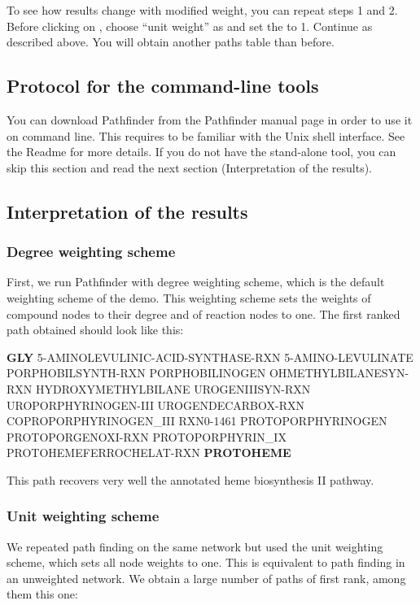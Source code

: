 To see how results change with modified weight, you can repeat steps 1 and 2. Before clicking on , choose ``unit weight'' as  and set the  to 1. Continue as described above. You will obtain another paths table than before.

\subsection{Protocol for the command-line tools}

You can download Pathfinder from the Pathfinder manual page in order to use it on command line.
This requires to be familiar with the Unix shell interface. See the Readme for more details.
If you do not have the stand-alone tool, you can skip this section
and read the next section (Interpretation of the results).

\subsection{Interpretation of the results}

\subsubsection{Degree weighting scheme}

First, we run Pathfinder with degree weighting scheme, which is the default weighting scheme of the demo. This weighting scheme sets the weights of compound nodes to their degree and of reaction nodes to one. The first ranked path obtained should look like this:

\textbf{GLY} 5-AMINOLEVULINIC-ACID-SYNTHASE-RXN  5-AMINO-LEVULINATE  PORPHOBILSYNTH-RXN PORPHOBILINOGEN OHMETHYLBILANESYN-RXN HYDROXYMETHYLBILANE UROGENIIISYN-RXN UROPORPHYRINOGEN-III UROGENDECARBOX-RXN COPROPORPHYRINOGEN\_III RXN0-1461 PROTOPORPHYRINOGEN PROTOPORGENOXI-RXN PROTOPORPHYRIN\_IX PROTOHEMEFERROCHELAT-RXN \textbf{PROTOHEME}

This path recovers very well the annotated heme biosynthesis II pathway.

\subsubsection{Unit weighting scheme}
We repeated path finding on the same network but used the unit weighting scheme, which sets all node weights to one. This is equivalent to path finding in an unweighted network. We obtain a large number of paths of first rank, among them this one:

